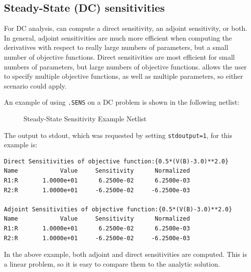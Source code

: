 \subsection{Steady-State (DC) sensitivities}

For DC analysis, \Xyce{} can compute a direct sensitivity, an adjoint
sensitivity, or both.  In general, adjoint sensitivities are much more
efficient when computing the derivatives with respect to really large
numbers of parameters, but a small number of objective functions.
Direct sensitivities are most efficient for small numbers of
parameters, but large numbers of objective functions.  \Xyce{} allows
the user to specify multiple objective functions, as well as multiple
parameters, so either scenario could apply.

An example of using \texttt{.SENS} on a DC problem is shown in the
following netlist:
\begin{figure}[htbp]
  \begin{centering}
\caption[Steady-State Sensitivity Example Netlist]
{Steady-State Sensitivity Example Netlist \label{DC_Sensitivity_Netlist} }
\end{centering}
\end{figure}
The output to stdout, which was requested by setting \texttt{stdoutput=1}, for this example is:
\begin{verbatim}
Direct Sensitivities of objective function:{0.5*(V(B)-3.0)**2.0}
Name	        Value	  Sensitivity	   Normalized
R1:R	   1.0000e+01	   6.2500e-02	   6.2500e-03
R2:R	   1.0000e+01	  -6.2500e-02	  -6.2500e-03

Adjoint Sensitivities of objective function:{0.5*(V(B)-3.0)**2.0}
Name	        Value	  Sensitivity	   Normalized
R1:R	   1.0000e+01	   6.2500e-02	   6.2500e-03
R2:R	   1.0000e+01	  -6.2500e-02	  -6.2500e-03
\end{verbatim}
In the above example, both adjoint and direct sensitivities are
computed.  This is a linear problem, so it is easy to compare them to
the analytic solution.

